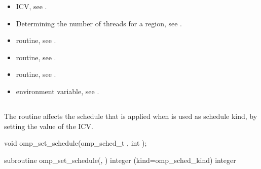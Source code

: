 \crossreferences
\begin{itemize}
\item {} ICV, see
.

\item Determining the number of threads for a  region, see
.

\item {} routine, see
.

\item {} routine, see
.

\item {} routine, see
.

\item {} environment variable, see
.
\end{itemize}









\subsection{}
\label{subsec:omp_set_schedule}
\summary
The  routine affects the schedule that is applied when 
is used as schedule kind, by setting the value of the  ICV.


\format
\begin{ccppspecific}
\begin{ompcFunction}
void omp_set_schedule(omp_sched_t , int );
\end{ompcFunction}
\end{ccppspecific}

\begin{fortranspecific}
\begin{ompfSubroutine}
subroutine omp_set_schedule(, )
integer (kind=omp_sched_kind) 
integer 
\end{ompfSubroutine}
\end{fortranspecific}

